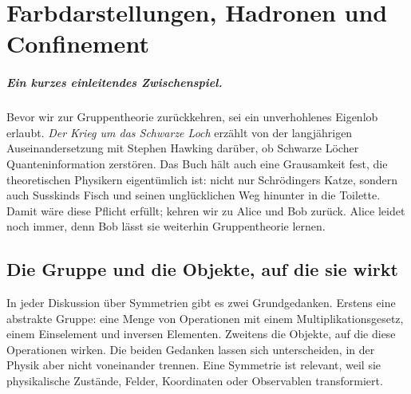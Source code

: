\chapter{Farbdarstellungen, Hadronen und Confinement}

\paragraph{Ein kurzes einleitendes Zwischenspiel.}
Bevor wir zur Gruppentheorie zurückkehren, sei ein unverhohlenes Eigenlob erlaubt. \emph{Der Krieg um das Schwarze Loch} erzählt von der langjährigen Auseinandersetzung mit Stephen Hawking darüber, ob Schwarze Löcher Quanteninformation zerstören. Das Buch hält auch eine Grausamkeit fest, die theoretischen Physikern eigentümlich ist: nicht nur Schrödingers Katze, sondern auch Susskinds Fisch und seinen unglücklichen Weg hinunter in die Toilette. Damit wäre diese Pflicht erfüllt; kehren wir zu Alice und Bob zurück. Alice leidet noch immer, denn Bob lässt sie weiterhin Gruppentheorie lernen.


\section{Die Gruppe und die Objekte, auf die sie wirkt}

In jeder Diskussion über Symmetrien gibt es zwei Grundgedanken. Erstens eine abstrakte Gruppe: eine Menge von Operationen mit einem Multiplikationsgesetz, einem Einselement und inversen Elementen. Zweitens die Objekte, auf die diese Operationen wirken. Die beiden Gedanken lassen sich unterscheiden, in der Physik aber nicht voneinander trennen. Eine Symmetrie ist relevant, weil sie physikalische Zustände, Felder, Koordinaten oder Observablen transformiert.

\begin{classroomqa}
\end{classroomqa}

